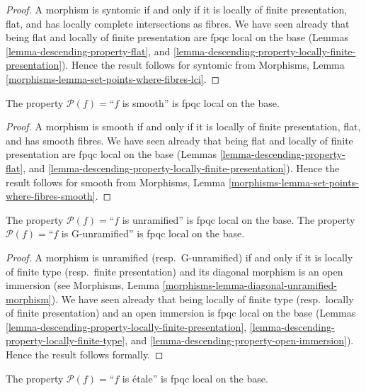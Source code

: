 \begin{proof}
A morphism is syntomic if and only if it is locally of finite presentation,
flat, and has locally complete intersections as fibres. We have seen
already that being flat and locally of finite presentation are
fpqc local on the base (Lemmas
\ref{lemma-descending-property-flat}, and
\ref{lemma-descending-property-locally-finite-presentation}).
Hence the result follows for syntomic from
Morphisms, Lemma \ref{morphisms-lemma-set-points-where-fibres-lci}.
\end{proof}

\begin{lemma}
\label{lemma-descending-property-smooth}
The property $\mathcal{P}(f) =$``$f$ is smooth''
is fpqc local on the base.
\end{lemma}

\begin{proof}
A morphism is smooth if and only if it is locally of finite presentation,
flat, and has smooth fibres. We have seen
already that being flat and locally of finite presentation are
fpqc local on the base (Lemmas
\ref{lemma-descending-property-flat}, and
\ref{lemma-descending-property-locally-finite-presentation}).
Hence the result follows for smooth from
Morphisms, Lemma \ref{morphisms-lemma-set-points-where-fibres-smooth}.
\end{proof}

\begin{lemma}
\label{lemma-descending-property-unramified}
The property $\mathcal{P}(f) =$``$f$ is unramified''
is fpqc local on the base.
The property $\mathcal{P}(f) =$``$f$ is G-unramified''
is fpqc local on the base.
\end{lemma}

\begin{proof}
A morphism is unramified (resp.\ G-unramified) if and only if it is
locally of finite type (resp.\ finite presentation)
and its diagonal morphism is an open immersion (see
Morphisms, Lemma \ref{morphisms-lemma-diagonal-unramified-morphism}).
We have seen already that being locally of finite type (resp.\ 
locally of finite presentation) and an open immersion is
fpqc local on the base (Lemmas
\ref{lemma-descending-property-locally-finite-presentation},
\ref{lemma-descending-property-locally-finite-type}, and
\ref{lemma-descending-property-open-immersion}).
Hence the result follows formally.
\end{proof}

\begin{lemma}
\label{lemma-descending-property-etale}
The property $\mathcal{P}(f) =$``$f$ is \'etale''
is fpqc local on the base.
\end{lemma}

